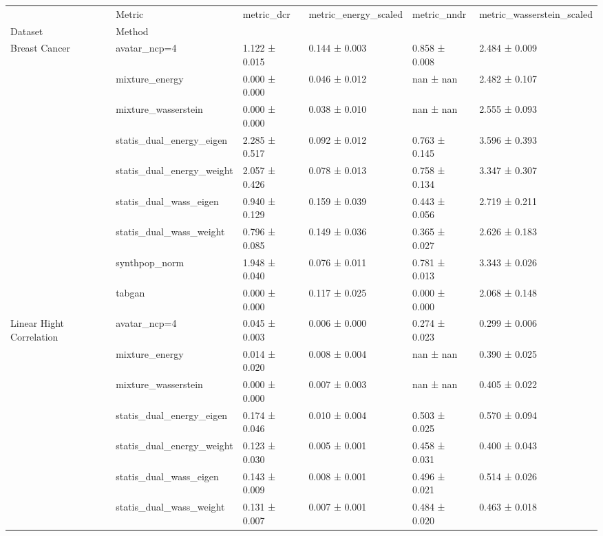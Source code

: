 \begin{tabular}{llllll}
\toprule
 & Metric & metric_dcr & metric_energy_scaled & metric_nndr & metric_wasserstein_scaled \\
Dataset & Method &  &  &  &  \\
\midrule
\multirow[t]{9}{*}{Breast Cancer} & avatar_ncp=4 & 1.122 ± 0.015 & 0.144 ± 0.003 & \cellcolor{myred}0.858 ± 0.008 & 2.484 ± 0.009 \\
 & mixture_energy & \cellcolor{mygreen}0.000 ± 0.000 & 0.046 ± 0.012 & nan ± nan & 2.482 ± 0.107 \\
 & mixture_wasserstein & \cellcolor{mygreen}0.000 ± 0.000 & \cellcolor{mygreen}0.038 ± 0.010 & nan ± nan & 2.555 ± 0.093 \\
 & statis_dual_energy_eigen & \cellcolor{myred}2.285 ± 0.517 & 0.092 ± 0.012 & 0.763 ± 0.145 & \cellcolor{myred}3.596 ± 0.393 \\
 & statis_dual_energy_weight & 2.057 ± 0.426 & 0.078 ± 0.013 & 0.758 ± 0.134 & 3.347 ± 0.307 \\
 & statis_dual_wass_eigen & 0.940 ± 0.129 & \cellcolor{myred}0.159 ± 0.039 & 0.443 ± 0.056 & 2.719 ± 0.211 \\
 & statis_dual_wass_weight & 0.796 ± 0.085 & 0.149 ± 0.036 & 0.365 ± 0.027 & 2.626 ± 0.183 \\
 & synthpop_norm & 1.948 ± 0.040 & 0.076 ± 0.011 & 0.781 ± 0.013 & 3.343 ± 0.026 \\
 & tabgan & \cellcolor{mygreen}0.000 ± 0.000 & 0.117 ± 0.025 & \cellcolor{mygreen}0.000 ± 0.000 & \cellcolor{mygreen}2.068 ± 0.148 \\
\cline{1-6}
\multirow[t]{9}{*}{Linear 
 Hight Correlation} & avatar_ncp=4 & 0.045 ± 0.003 & 0.006 ± 0.000 & 0.274 ± 0.023 & \cellcolor{mygreen}0.299 ± 0.006 \\
 & mixture_energy & 0.014 ± 0.020 & 0.008 ± 0.004 & nan ± nan & 0.390 ± 0.025 \\
 & mixture_wasserstein & \cellcolor{mygreen}0.000 ± 0.000 & 0.007 ± 0.003 & nan ± nan & 0.405 ± 0.022 \\
 & statis_dual_energy_eigen & \cellcolor{myred}0.174 ± 0.046 & 0.010 ± 0.004 & \cellcolor{myred}0.503 ± 0.025 & \cellcolor{myred}0.570 ± 0.094 \\
 & statis_dual_energy_weight & 0.123 ± 0.030 & \cellcolor{mygreen}0.005 ± 0.001 & 0.458 ± 0.031 & 0.400 ± 0.043 \\
 & statis_dual_wass_eigen & 0.143 ± 0.009 & 0.008 ± 0.001 & 0.496 ± 0.021 & 0.514 ± 0.026 \\
 & statis_dual_wass_weight & 0.131 ± 0.007 & 0.007 ± 0.001 & 0.484 ± 0.020 & 0.463 ± 0.018 \\

\end{tabular}

